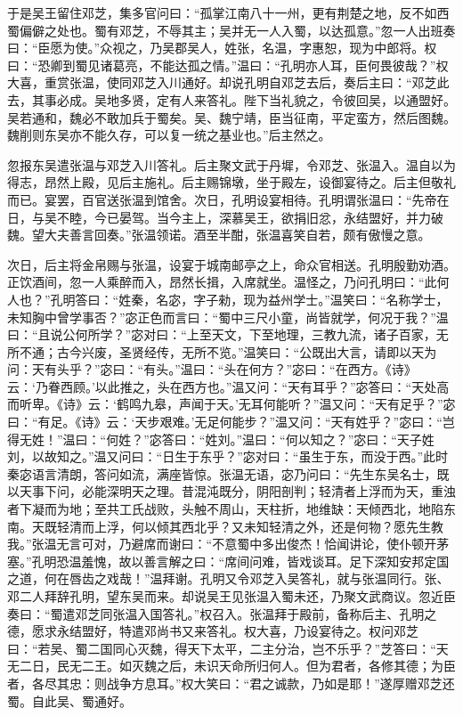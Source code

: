 于是吴王留住邓芝，集多官问曰：“孤掌江南八十一州，更有荆楚之地，反不如西蜀偏僻之处也。蜀有邓芝，不辱其主；吴并无一人入蜀，以达孤意。”忽一人出班奏曰：“臣愿为使。”众视之，乃吴郡吴人，姓张，名温，字惠恕，现为中郎将。权曰：“恐卿到蜀见诸葛亮，不能达孤之情。”温曰：“孔明亦人耳，臣何畏彼哉？”权大喜，重赏张温，使同邓芝入川通好。却说孔明自邓芝去后，奏后主曰：“邓芝此去，其事必成。吴地多贤，定有人来答礼。陛下当礼貌之，令彼回吴，以通盟好。吴若通和，魏必不敢加兵于蜀矣。吴、魏宁靖，臣当征南，平定蛮方，然后图魏。魏削则东吴亦不能久存，可以复一统之基业也。”后主然之。

忽报东吴遣张温与邓芝入川答礼。后主聚文武于丹墀，令邓芝、张温入。温自以为得志，昂然上殿，见后主施礼。后主赐锦墩，坐于殿左，设御宴待之。后主但敬礼而已。宴罢，百官送张温到馆舍。次日，孔明设宴相待。孔明谓张温曰：“先帝在日，与吴不睦，今已晏驾。当今主上，深慕吴王，欲捐旧忿，永结盟好，并力破魏。望大夫善言回奏。”张温领诺。酒至半酣，张温喜笑自若，颇有傲慢之意。

次日，后主将金帛赐与张温，设宴于城南邮亭之上，命众官相送。孔明殷勤劝酒。正饮酒间，忽一人乘醉而入，昂然长揖，入席就坐。温怪之，乃问孔明曰：“此何人也？”孔明答曰：“姓秦，名宓，字子勑，现为益州学士。”温笑曰：“名称学士，未知胸中曾学事否？”宓正色而言曰：“蜀中三尺小童，尚皆就学，何况于我？”温曰：“且说公何所学？”宓对曰：“上至天文，下至地理，三教九流，诸子百家，无所不通；古今兴废，圣贤经传，无所不览。”温笑曰：“公既出大言，请即以天为问：天有头乎？”宓曰：“有头。”温曰：“头在何方？”宓曰：“在西方。《诗》云：‘乃眷西顾。’以此推之，头在西方也。”温又问：“天有耳乎？”宓答曰：“天处高而听卑。《诗》云：‘鹤鸣九皋，声闻于天。’无耳何能听？”温又问：“天有足乎？”宓曰：“有足。《诗》云：‘天步艰难。’无足何能步？”温又问：“天有姓乎？”宓曰：“岂得无姓！”温曰：“何姓？”宓答曰：“姓刘。”温曰：“何以知之？”宓曰：“天子姓刘，以故知之。”温又问曰：“日生于东乎？”宓对曰：“虽生于东，而没于西。”此时秦宓语言清朗，答问如流，满座皆惊。张温无语，宓乃问曰：“先生东吴名士，既以天事下问，必能深明天之理。昔混沌既分，阴阳剖判；轻清者上浮而为天，重浊者下凝而为地；至共工氏战败，头触不周山，天柱折，地维缺：天倾西北，地陷东南。天既轻清而上浮，何以倾其西北乎？又未知轻清之外，还是何物？愿先生教我。”张温无言可对，乃避席而谢曰：“不意蜀中多出俊杰！恰闻讲论，使仆顿开茅塞。”孔明恐温羞愧，故以善言解之曰：“席间问难，皆戏谈耳。足下深知安邦定国之道，何在唇齿之戏哉！”温拜谢。孔明又令邓芝入吴答礼，就与张温同行。张、邓二人拜辞孔明，望东吴而来。却说吴王见张温入蜀未还，乃聚文武商议。忽近臣奏曰：“蜀遣邓芝同张温入国答礼。”权召入。张温拜于殿前，备称后主、孔明之德，愿求永结盟好，特遣邓尚书又来答礼。权大喜，乃设宴待之。权问邓芝曰：“若吴、蜀二国同心灭魏，得天下太平，二主分治，岂不乐乎？”芝答曰：“天无二日，民无二王。如灭魏之后，未识天命所归何人。但为君者，各修其德；为臣者，各尽其忠：则战争方息耳。”权大笑曰：“君之诚款，乃如是耶！”遂厚赠邓芝还蜀。自此吴、蜀通好。


